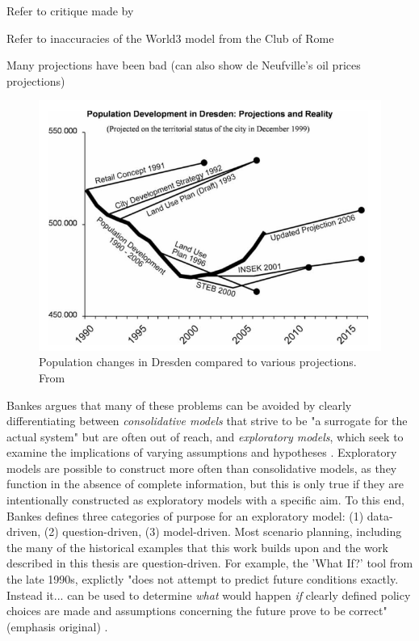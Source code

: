 Refer to critique made by \cite{leejrRequiemLargeScaleModels1973}


Refer to inaccuracies of the World3 model from the Club of Rome

Many projections have been bad (can also show de Neufville's oil prices projections)


\begin{figure}[h]
	\centering
	\includegraphics[scale=0.35]{Figures/chap2/dresden_projections.png}
	\caption[Population changes in Dresden compared to various projections]{Population changes in Dresden compared to various projections. From \cite{wiechmannErrorsExpectedAligning2008}}
	\label{fig:dresden_population}
\end{figure}

Bankes argues that many of these problems can be avoided by clearly differentiating between \textit{consolidative models} that strive to be "a surrogate for the actual system" but are often out of reach, and \textit{exploratory models}, which seek to examine the implications of varying assumptions and hypotheses \cite{bankesExploratoryModelingPolicy1993}. Exploratory models are possible to construct more often than consolidative models, as they function in the absence of complete information, but this is only true if they are intentionally constructed as exploratory models with a specific aim.  To this end, Bankes defines three categories of purpose for an exploratory model: (1) data-driven, (2) question-driven, (3) model-driven. Most scenario planning, including the many of the historical examples that this work builds upon and the work described in this thesis are question-driven. For example, the 'What If?' tool from the late 1990s, explictly "does not attempt to predict future conditions exactly. Instead it... can be used to determine \textit{what} would happen \textit{if} clearly defined policy choices are made and assumptions concerning the future prove to be correct" (emphasis original) \cite{klostermanWhatIfCollaborative1999}.


